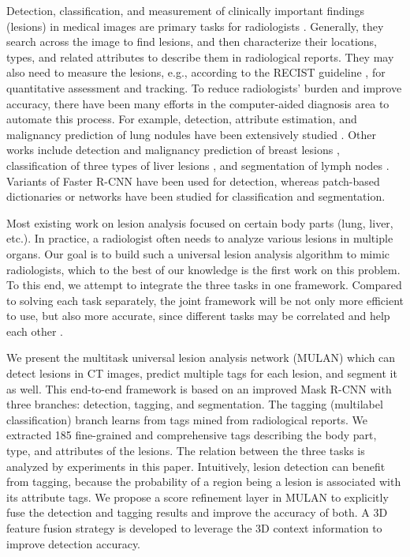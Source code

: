 \documentclass[runningheads]{llncs}
\begin{document}
Detection, classification, and measurement of clinically important findings (lesions) in medical images are primary tasks for radiologists \cite{Sahiner2018survey}. Generally, they search across the image to find lesions, and then characterize their locations, types, and related attributes to describe them in radiological reports. They may also need to measure the lesions, e.g., according to the RECIST guideline \cite{Eisenhauer2009RECIST}, for quantitative assessment and tracking. To reduce radiologists' burden and improve accuracy, there have been many efforts in the computer-aided diagnosis area to automate this process. For example, detection, attribute estimation, and malignancy prediction of lung nodules have been extensively studied \cite{Liao2019leaky,Wu2018joint}. Other works include detection and malignancy prediction of breast lesions \cite{Ribli2018breast}, classification of three types of liver lesions \cite{Diamant2016liver}, and segmentation of lymph nodes \cite{Tang2019LNGAN}. Variants of Faster R-CNN \cite{Ribli2018breast,Liao2019leaky} have been used for detection, whereas patch-based dictionaries \cite{Diamant2016liver} or networks \cite{Liao2019leaky,Wu2018joint} have been studied for classification and segmentation.

Most existing work on lesion analysis focused on certain body parts (lung, liver, etc.). In practice, a radiologist often needs to analyze various lesions in multiple organs. Our goal is to build such a universal lesion analysis algorithm to mimic radiologists, which to the best of our knowledge is the first work on this problem. To this end, we attempt to integrate the three tasks in one framework. Compared to solving each task separately, the joint framework will be not only more efficient to use, but also more accurate, since different tasks may be correlated and help each other \cite{Tang2019Uldor,Wu2018joint}.

We present the multitask universal lesion analysis network (MULAN) which can detect lesions in CT images, predict multiple tags for each lesion, and segment it as well. This end-to-end framework is based on an improved Mask R-CNN \cite{He2017MaskRCNN} with three branches: detection, tagging, and segmentation. The tagging (multilabel classification) branch learns from tags mined from radiological reports. We extracted 185 fine-grained and comprehensive tags describing the body part, type, and attributes of the lesions. The relation between the three tasks is analyzed by experiments in this paper. Intuitively, lesion detection can benefit from tagging, because the probability of a region being a lesion is associated with its attribute tags. We propose a score refinement layer in MULAN to explicitly fuse the detection and tagging results and improve the accuracy of both. A 3D feature fusion strategy is developed to leverage the 3D context information to improve detection accuracy. 
\end{document}
